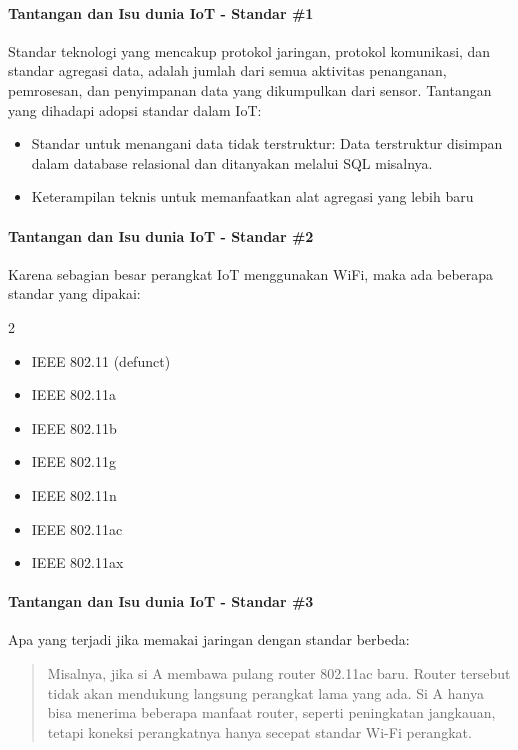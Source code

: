 \begin{frame}{\insertsectionhead}
	\framesubtitle{Tantangan dan Isu dunia IoT - Standar \#1}
	\justifying
	Standar teknologi yang mencakup protokol jaringan, protokol komunikasi, dan standar agregasi data, adalah jumlah dari semua aktivitas penanganan, pemrosesan, dan penyimpanan data yang dikumpulkan dari sensor. Tantangan yang dihadapi adopsi standar dalam IoT:
	\vfill
	\begin{itemize}
		\item  Standar untuk menangani data tidak terstruktur: Data terstruktur disimpan dalam database relasional dan ditanyakan melalui SQL misalnya.
		\item  Keterampilan teknis untuk memanfaatkan alat agregasi yang lebih baru
	\end{itemize}
\end{frame}

\begin{frame}{\insertsectionhead}
	\framesubtitle{Tantangan dan Isu dunia IoT - Standar \#2}
	\justifying
	Karena sebagian besar perangkat IoT menggunakan WiFi, maka ada beberapa standar yang dipakai:
	\vfill
	\begin{multicols}{2}
		\begin{itemize}
			\item IEEE 802.11 (defunct)
			\item IEEE 802.11a
			\item IEEE 802.11b
			\item IEEE 802.11g
			\item IEEE 802.11n
			\item IEEE 802.11ac
			\item IEEE 802.11ax
		\end{itemize}
	\end{multicols}
	\vfill
\end{frame}

\begin{frame}{\insertsectionhead}
	\framesubtitle{Tantangan dan Isu dunia IoT - Standar \#3}
	\justifying
	Apa yang terjadi jika memakai jaringan dengan standar berbeda:
	\vfill
	\begin{quote}
		Misalnya, jika si A membawa pulang router 802.11ac baru. Router tersebut tidak akan mendukung langsung perangkat lama yang ada. Si A hanya bisa menerima beberapa manfaat router, seperti peningkatan jangkauan, tetapi koneksi perangkatnya hanya secepat standar Wi-Fi perangkat.
	\end{quote}
\end{frame}

